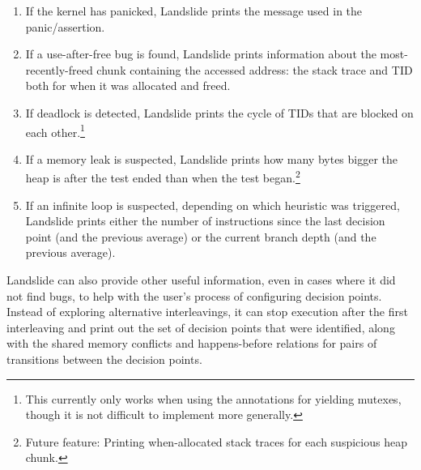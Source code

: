 \begin{enumerate}
	\item If the kernel has panicked, Landslide prints the message used in the panic/assertion.
	\item If a use-after-free bug is found, Landslide prints information about the most-recently-freed chunk containing the accessed address: the stack trace and TID both for when it was allocated and freed.
	\item If deadlock is detected, Landslide prints the cycle of TIDs that are blocked on each other.\footnote{This currently only works when using the annotations for yielding mutexes, though it is not difficult to implement more generally.}
	\item If a memory leak is suspected, Landslide prints how many bytes bigger the heap is after the test ended than when the test began.\footnote{Future feature: Printing when-allocated stack traces for each suspicious heap chunk.}
	\item If an infinite loop is suspected, depending on which heuristic was triggered, Landslide prints either the number of instructions since the last decision point (and the previous average) or the current branch depth (and the previous average).
\end{enumerate}

Landslide can also provide other useful information, even in cases where it did not find bugs, to help with the user's process of configuring decision points. Instead of exploring alternative interleavings, it can stop execution after the first interleaving and print out the set of decision points that were identified, along with the shared memory conflicts and happens-before relations for pairs of transitions between the decision points.

